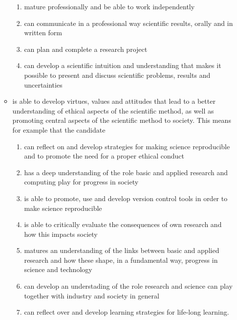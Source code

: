 \documentclass[%
oneside,                 %
final,                   %
10pt]{article}
\begin{document}
\begin{itemize}
\begin{itemize}
\begin{enumerate}
 \item mature professionally and be able to work independently

 \item can communicate in a professional way scientific results, orally and in written form

 \item can plan and complete a research project

 \item can develop a scientific intuition and understanding that makes it possible to present and discuss scientific problems, results and uncertainties

\end{enumerate}

\noindent
 \item is able to develop virtues, values and attitudes that lead to  a better understanding of ethical aspects of the scientific method, as well as promoting central aspects of the scientific method to society. This means for example that the candidate
\begin{enumerate}

 \item can reflect on and develop strategies for making science reproducible and to promote the need for a proper ethical conduct

 \item has a deep understanding of the role basic and applied  research and computing play for progress in society

 \item is able to promote, use and develop version control tools in order to make science reproducible

 \item is able to critically evaluate the consequences of own research and how this impacts society

 \item matures an understanding of the links between basic and applied research and how these shape, in a fundamental way,  progress in science and technology

 \item can develop an understading of the role research and science can play together with industry and society in general

 \item can reflect over and develop learning strategies for life-long learning.
\end{enumerate}

\noindent
\end{itemize}

\noindent
\end{itemize}
\end{document}
